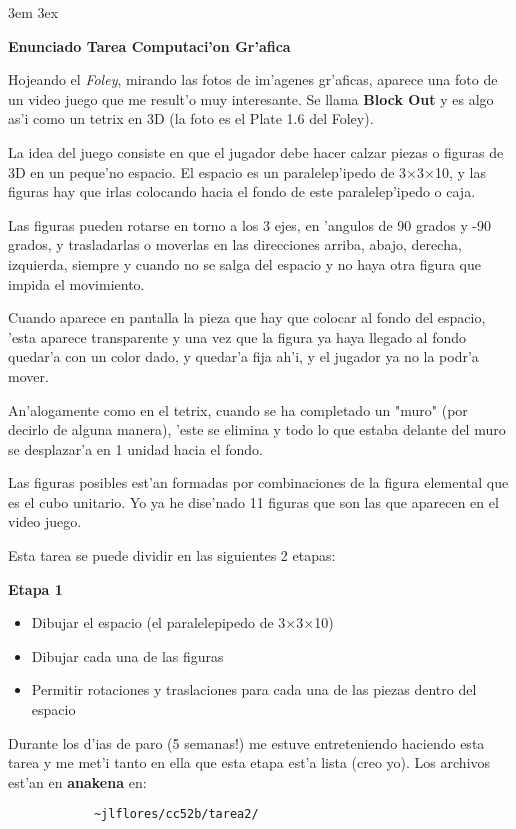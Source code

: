 \oddsidemargin 0cm
\textwidth 16cm 
\topmargin -1cm 
\headheight 0cm 
\textheight 22cm
\parindent 3em  
\parskip 3ex    


{\Large\bf Enunciado Tarea Computaci'on Gr'afica}

Hojeando el {\em Foley}, mirando las fotos de im'agenes gr'aficas, aparece una foto de un
video juego que me result'o muy interesante. Se llama {\bf Block Out} y es algo as'i como
un tetrix en 3D (la foto es el Plate 1.6 del Foley).

La idea del juego consiste en que el jugador debe hacer calzar piezas o figuras de
3D en un peque'no espacio.
El espacio es un paralelep'ipedo de 3$\times$3$\times$10, y las figuras hay que irlas colocando
hacia el fondo de este paralelep'ipedo o caja. 

Las figuras pueden rotarse en torno a los 3 ejes, en 'angulos de 90 grados y -90 grados, y
trasladarlas o moverlas en las direcciones arriba, abajo, derecha, izquierda, 
siempre y cuando no se salga del espacio y no haya otra 
figura que impida el movimiento.

Cuando aparece en pantalla la pieza que hay que colocar al fondo del espacio, 'esta
aparece transparente y una vez que la figura ya haya llegado al fondo quedar'a con un
color dado, y quedar'a fija ah'i, y el jugador ya no la podr'a mover.

An'alogamente como en el tetrix, cuando se ha completado un "muro" (por decirlo de
alguna manera), 'este se elimina y todo lo que estaba delante del muro  se desplazar'a
en 1 unidad hacia el fondo.

Las figuras posibles est'an formadas por combinaciones de la figura elemental que es
el cubo unitario.
Yo ya he dise'nado 11 figuras que son las que aparecen en el video juego.

Esta tarea se puede dividir en las siguientes 2 etapas:

{\large\bf Etapa 1}
\begin{itemize}
    \item Dibujar el espacio (el paralelepipedo de 3$\times$3$\times$10)
    \item Dibujar cada una de las figuras
    \item Permitir rotaciones y traslaciones para cada una de las piezas dentro del
     espacio
\end{itemize}
     Durante los d'ias de paro (5 semanas!) me estuve entreteniendo haciendo esta tarea y me met'i tanto en ella
     que esta etapa est'a lista (creo yo). Los archivos est'an en {\bf anakena} en:
\begin{verbatim}
            ~jlflores/cc52b/tarea2/
\end{verbatim}


